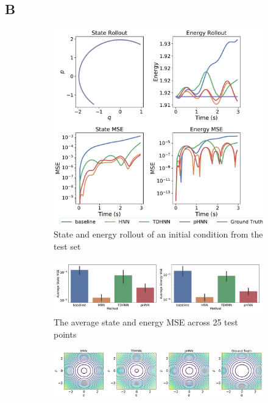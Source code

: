 \documentclass[twoside]{article}
\begin{document}
\pagebreak
\twocolumn
\subsection*{B}

\begin{figure}[!htb]
\centering
\captionsetup{justification=centering}
\begin{subfigure}[b]{0.48\textwidth}
\includegraphics[width=\textwidth]{figures/figures/mass_spring/1/mass_spring_long_0.pdf}
\caption{State and energy rollout of an initial condition from the test set}
\end{subfigure}
\begin{subfigure}[b]{0.48\textwidth}
\includegraphics[width=\textwidth]{figures/figures/mass_spring/1/mass_spring_errors_0.pdf}
\caption{The average state and energy MSE across 25 test points}
\end{subfigure}
\begin{subfigure}[b]{0.48\textwidth}
\includegraphics[width=\textwidth]{figures/figures/mass_spring/1/mass_spring_hamiltonian_0.pdf}

\end{subfigure}
\end{figure}
\end{document}
